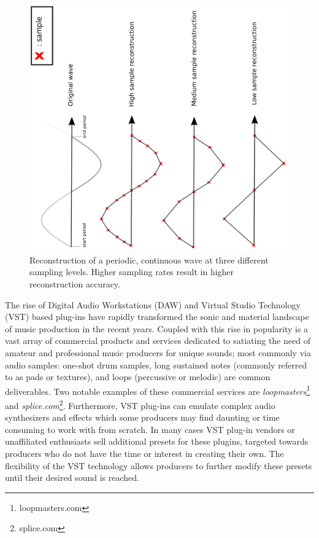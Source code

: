 \documentclass[\main/thesis.tex]{subfiles}
\begin{document}
\begin{figure}[h]
\label{fig_sampling_rate}
\centering
\includegraphics[width=1\linewidth,angle =-90 ]{images/periodic_function_decimation.png}
\caption{Reconstruction of a periodic, continuous wave at three different sampling levels. Higher sampling rates result in higher reconstruction accuracy. }
\end{figure}






The rise of Digital Audio Workstations (DAW) \cite{leider2004digital} and Virtual Studio Technology (VST) based plug-ins \cite{tanev2013virtual} have rapidly transformed the sonic and material landscape of music production in the recent years. Coupled with this rise in popularity is a vast array of commercial products and services dedicated to satiating the need of amateur and professional music producers for unique sounds; most commonly via audio samples: one-shot drum samples, long sustained notes (commonly referred to as pads or textures), and loops (percussive or melodic) are common deliverables. Two notable examples of these commercial services are \textit{loopmasters}\footnote{loopmasters.com} and \textit{splice.com}\footnote{splice.com}. Furthermore, VST plug-ins can emulate complex audio synthesizers and effects which some producers may find daunting or time consuming to work with from scratch. In many cases VST plug-in vendors or unaffiliated enthusiasts sell additional presets for these plugins, targeted towards producers who do not have the time or interest in creating their own. The flexibility of the VST technology allows producers to further modify these presets until their desired sound is reached.
\end{document}
